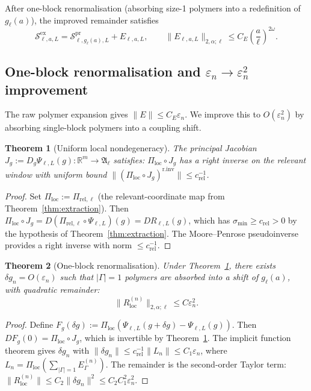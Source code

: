 \documentclass[12pt]{article}
\theoremstyle{plain}
\newtheorem{theorem}{Theorem}[section]
\theoremstyle{definition}
\numberwithin{equation}{section}
\newcommand{\R}{\mathbb{R}}
\newcommand{\fA}{\mathfrak{A}}
\newcommand{\pr}{\mathrm{pr}}
\newcommand{\loc}{\mathrm{loc}}
\newcommand{\ex}{\mathrm{ex}}
\begin{document}
After one-block renormalisation (absorbing size-1 polymers into a redefinition of $g_\ell(a)$), the improved remainder satisfies
\begin{equation}
\boxed{\mathcal{S}^{\ex}_{\ell,a,L} = \mathcal{S}^{\pr}_{\ell,g_\ell(a),L} + E_{\ell,a,L},\qquad
\|E_{\ell,a,L}\|_{2,\alpha;\ell} \leq C_E\left(\frac{a}{\ell}\right)^{2\omega}.}
\end{equation}

\subsection{One-block renormalisation and $\varepsilon_n\to\varepsilon_n^2$ improvement}\label{sec:oneblock}

The raw polymer expansion gives $\|E\|\leq C_E\varepsilon_n$.  We improve this to $O(\varepsilon_n^2)$ by absorbing single-block polymers into a coupling shift.

\begin{theorem}[Uniform local nondegeneracy]\label{thm:localnondeg}
The principal Jacobian $J_g:=D_g\Psi_{\ell,L}(g):\R^m\to\fA_\ell$ satisfies: $\Pi_{\loc}\circ J_g$ has a right inverse on the relevant window with uniform bound $\|(\Pi_{\loc}\circ J_g)^{\mathrm{r.inv}}\|\leq c_{\mathrm{rel}}^{-1}$.
\end{theorem}

\begin{proof}
Set $\Pi_{\loc}:=\Pi_{\mathrm{rel},\ell}$ (the relevant-coordinate map from Theorem~\ref{thm:extraction}).  Then $\Pi_{\loc}\circ J_g=D(\Pi_{\mathrm{rel},\ell}\circ\Psi_{\ell,L})(g)=DR_{\ell,L}(g)$, which has $\sigma_{\min}\geq c_{\mathrm{rel}}>0$ by the hypothesis of Theorem~\ref{thm:extraction}.  The Moore--Penrose pseudoinverse provides a right inverse with norm $\leq c_{\mathrm{rel}}^{-1}$.
\end{proof}

\begin{theorem}[One-block renormalisation]\label{thm:oneblock}
Under Theorem~\ref{thm:localnondeg}, there exists $\delta g_n=O(\varepsilon_n)$ such that $|\Gamma|=1$ polymers are absorbed into a shift of $g_\ell(a)$, with quadratic remainder:
\begin{equation}
\|R_{\loc}^{(n)}\|_{2,\alpha;\ell} \leq C\varepsilon_n^2.
\end{equation}
\end{theorem}

\begin{proof}
Define $F_g(\delta g):=\Pi_{\loc}(\Psi_{\ell,L}(g+\delta g)-\Psi_{\ell,L}(g))$.  Then $DF_g(0)=\Pi_{\loc}\circ J_g$, which is invertible by Theorem~\ref{thm:localnondeg}.  The implicit function theorem gives $\delta g_n$ with $\|\delta g_n\|\leq c_{\mathrm{rel}}^{-1}\|L_n\|\leq C_1\varepsilon_n$, where $L_n=\Pi_{\loc}(\sum_{|\Gamma|=1}E_\Gamma^{(n)})$.  The remainder is the second-order Taylor term: $\|R_{\loc}^{(n)}\|\leq C_2\|\delta g_n\|^2\leq C_2 C_1^2\varepsilon_n^2$.
\end{proof}
\end{document}
